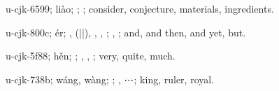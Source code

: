 \begin{multicols}{2}
{\cjkgGlue{}u-cjk-6599; liào; \cjkgGlue{}; \cjkgGlue{}; consider, conjecture, materials, ingredients.

\cjkgGlue{}u-cjk-800c; ér; \cjkgGlue{}\cjkgGlue{}\cjkgGlue{}, \cjkgGlue{}\cjkgGlue{}(\cjkgGlue{}|\cjkgGlue{}|\cjkgGlue{}), \cjkgGlue{}, \cjkgGlue{}, \cjkgGlue{}; \cjkgGlue{}, \cjkgGlue{}; and, and then, and yet, but.

\cjkgGlue{}u-cjk-5f88; hěn; \cjkgGlue{}\cjkgGlue{}\cjkgGlue{}; \cjkgGlue{}, \cjkgGlue{}, \cjkgGlue{}; very, quite, much.

\cjkgGlue{}u-cjk-738b; wáng, wàng; \cjkgGlue{}; \cjkgGlue{}, {\mktsRsgFb{}⋯}\cjkgGlue{}; king, ruler, royal.

}
\end{multicols}
